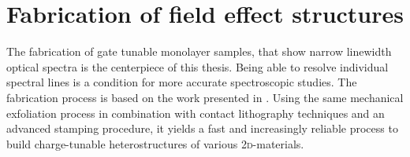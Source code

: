 \chapter{Fabrication of field effect structures}\label{exfoliation}

The fabrication of gate tunable \tmdg monolayer samples, that show narrow linewidth optical spectra is the centerpiece of this thesis. Being able to resolve individual spectral lines is a condition for more accurate spectroscopic studies. The fabrication process is based on the work presented in  \cite{funk_spectroscopy_2017}. Using the same mechanical exfoliation process in combination with contact lithography techniques and an advanced stamping procedure, it yields a fast and increasingly reliable process to build charge-tunable heterostructures of various \textsc{2d}-materials. 


